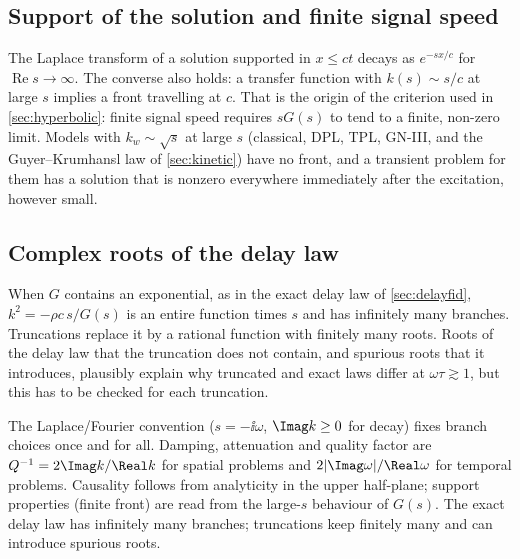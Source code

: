 \subsection{Support of the solution and finite signal speed}
The Laplace transform of a solution supported in $x\le ct$ decays as $e^{-sx/c}$ for $\operatorname{Re}s\to\infty$. The converse also holds: a transfer function with $k(s)\sim s/c$ at large $s$ implies a front travelling at $c$. That is the origin of the criterion used in \cref{sec:hyperbolic}: finite signal speed requires $sG(s)$ to tend to a finite, non-zero limit. Models with $k_w\sim\sqrt{s}$ at large $s$ (classical, DPL, TPL, GN-III, and the Guyer--Krumhansl law of \cref{sec:kinetic}) have no front, and a transient problem for them has a solution that is nonzero everywhere immediately after the excitation, however small.

\subsection{Complex roots of the delay law}
When $G$ contains an exponential, as in the exact delay law of \cref{sec:delayfid}, $k^2=-\rho c\,s/G(s)$ is an entire function times $s$ and has infinitely many branches. Truncations replace it by a rational function with finitely many roots. Roots of the delay law that the truncation does not contain, and spurious roots that it introduces, plausibly explain why truncated and exact laws differ at $\omega\tau\gtrsim1$, but this has to be checked for each truncation.

\begin{summarybox}[Summary]
The Laplace/Fourier convention ($s=-\ii\omega$, $\Imag k\ge0$ for decay) fixes branch choices once and for all. Damping, attenuation and quality factor are $Q^{-1}=2\Imag k/\Real k$ for spatial problems and $2|\Imag\omega|/\Real\omega$ for temporal problems. Causality follows from analyticity in the upper half-plane; support properties (finite front) are read from the large-$s$ behaviour of $G(s)$. The exact delay law has infinitely many branches; truncations keep finitely many and can introduce spurious roots.
\end{summarybox}
